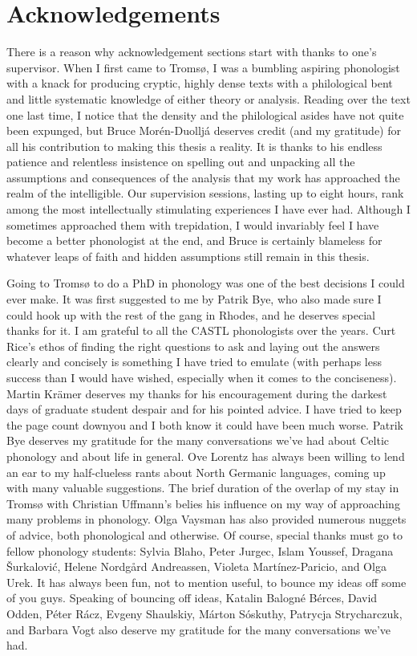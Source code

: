 \chapter{Acknowledgements}
\label{cha:acknowledgements}

There is a reason why acknowledgement sections start with thanks to one's supervisor. When I first came to Tromsø, I was a bumbling aspiring phonologist with a knack for producing cryptic, highly dense texts with a philological bent and little systematic knowledge of either theory or analysis. Reading over the text one last time, I notice that the density and the philological asides have not quite been expunged, but Bruce Morén-Duolljá deserves credit (and my gratitude) for all his contribution to making this thesis a reality. It is thanks to his endless patience and relentless insistence on spelling out and unpacking all the assumptions and consequences of the analysis that my work has approached the realm of the intelligible. Our supervision sessions, lasting up to eight hours, rank among the most intellectually stimulating experiences I have ever had. Although I sometimes approached them with trepidation, I would invariably feel I have become a better phonologist at the end, and Bruce is certainly blameless for whatever leaps of faith and hidden assumptions still remain in this thesis.

Going to Tromsø to do a PhD in phonology was one of the best decisions I could ever make. It was first suggested to me by Patrik Bye, who also made sure I could hook up with the rest of the gang in Rhodes, and he deserves special thanks for it. I am grateful to all the CASTL phonologists over the years. Curt Rice's ethos of finding the right questions to ask and laying out the answers clearly and concisely is something I have tried to emulate (with perhaps less success than I would have wished, especially when it comes to the conciseness). Martin Krämer deserves my thanks for his encouragement during the darkest days of graduate student despair and for his pointed advice. I have tried to keep the page count down\dash you and I both know it could have been much worse. Patrik Bye deserves my gratitude for the many conversations we've had about Celtic phonology and about life in general. Ove Lorentz has always been willing to lend an ear to my half\hyp clueless rants about North Germanic languages, coming up with many valuable suggestions. The brief duration of the overlap of my stay in Tromsø with Christian Uffmann's belies his influence on my way of approaching many problems in phonology. Olga Vaysman has also provided numerous nuggets of advice, both phonological and otherwise. Of course, special thanks must go to fellow phonology students: Sylvia Blaho, Peter Jurgec, Islam Youssef, Dragana Šurkalović, Helene Nordgård Andreassen, Violeta Martínez-Paricio, and Olga Urek. It has always been fun, not to mention useful, to bounce my ideas off some of you guys. Speaking of bouncing off ideas, Katalin Balogné Bérces, David Odden, Péter Rácz, Evgeny Shaulskiy, Márton Sóskuthy, Patrycja Strycharczuk, and Barbara Vogt also deserve my gratitude for the many conversations we've had.

